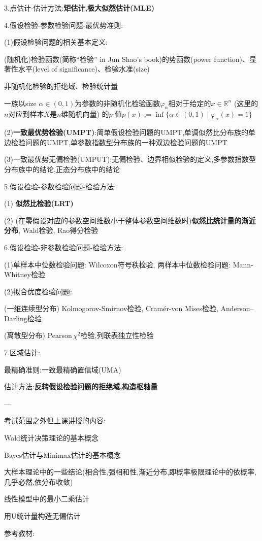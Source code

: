 3.点估计-估计方法:\textbf{矩估计,极大似然估计(MLE)}

4.假设检验-参数检验问题-最优势准则:

(1)假设检验问题的相关基本定义:

(随机化)检验函数(简称“检验” in Jun Shao's book)的势函数(power function)、显著性水平(level of significance)、检验水准(size)

非随机化检验的拒绝域、检验统计量

一族以size $\alpha\in(0,1)$为参数的非随机化检验函数$\varphi_{\alpha}$相对于给定的$x\in \mathbb{R}^{n}$ (这里的$n$对应到样本$X$是$n$维随机向量) 的$p$-值$p(x):=\inf\{\alpha\in (0,1)\mid \varphi_{\alpha}(x)=1\}$

(2)\textbf{一致最优势检验(UMPT)}:简单假设检验问题的UMPT,单调似然比分布族的单边检验问题的UMPT,单参数指数型分布族的一种双边检验问题的UMPT

(3)一致最优势无偏检验(UMPUT):无偏检验、边界相似检验的定义,多参数指数型分布族中的结论,正态分布族中的结论

5.假设检验-参数检验问题-检验方法:

(1) \textbf{似然比检验(LRT)}

(2) (在零假设对应的参数空间维数小于整体参数空间维数时)\textbf{似然比统计量的渐近分布}, Wald检验, Rao得分检验

6.假设检验-非参数检验问题-检验方法:

(1)单样本中位数检验问题: Wilcoxon符号秩检验, 两样本中位数检验问题: Mann-Whitney检验

(2)拟合优度检验问题:

(一维连续型分布) Kolmogorov-Smirnov检验, Cramér-von Mises检验, Anderson–Darling检验

(离散型分布) Pearson$\,\chi^2$检验,列联表独立性检验

7.区域估计:

最精确准则:一致最精确置信域(UMA)

估计方法:\textbf{反转假设检验问题的拒绝域,构造枢轴量}

---

考试范围之外但上课讲授的内容:

Wald统计决策理论的基本概念

Bayes估计与Minimax估计的基本概念

大样本理论中的一些结论(相合性,强相和性,渐近分布,即概率极限理论中的依概率,几乎必然,依分布收敛)

线性模型中的最小二乘估计

用U统计量构造无偏估计

参考教材:

